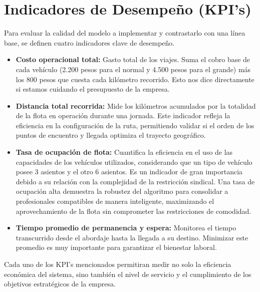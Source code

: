 \section{Indicadores de Desempeño (KPI's)}
Para evaluar la calidad del modelo a implementar y contrastarlo con una línea base, se definen cuatro indicadores clave de desempeño. 

\begin{itemize}
    \item \textbf{Costo operacional total:} Gasto total de los viajes. Suma el cobro base de cada vehículo (2.200 pesos para el normal y 4.500 pesos para el grande) más los 800 pesos que cuesta cada kilómetro recorrido. Esto nos dice directamente si estamos cuidando el presupuesto de la empresa.
    \item \textbf{Distancia total recorrida:}
    Mide los kilómetros acumulados por la totalidad de la flota en operación durante una jornada. Este indicador refleja la eficiencia en la configuración de la ruta, permitiendo validar si el orden de los puntos de encuentro y llegada optimiza el trayecto geográfico.
    \item \textbf{Tasa de ocupación de flota:} Cuantifica la eficiencia en el uso de las capacidades de los vehículos utilizados, considerando que un tipo de vehículo posee 3 asientos y el otro 6 asientos. Es un indicador de gran importancia debido a su relación con la complejidad de la restricción sindical. Una tasa de ocupación alta demuestra la robustez del algoritmo para consolidar a profesionales compatibles de manera inteligente, maximizando el aprovechamiento de la flota sin comprometer las restricciones de comodidad.
    \item \textbf{Tiempo promedio de permanencia y espera:}
    Monitorea el tiempo transcurrido desde el abordaje hasta la llegada a su destino. Minimizar este promedio es muy importante para garantizar el bienestar laboral.

\end{itemize}

Cada uno de los KPI's mencionados permitiran medir no solo la eficiencia económica del sistema, sino también el nivel de servicio y el cumplimiento de los objetivos estratégicos de la empresa.

